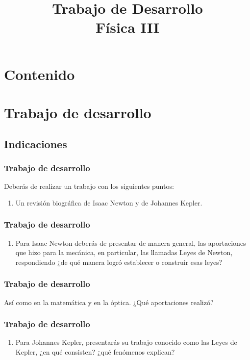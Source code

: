 \documentclass[14pt]{beamer}
\title{\Large{Trabajo de Desarrollo} \\ \normalsize{Física III}}
\date{}
\begin{document}
\maketitle
  
\section*{Contenido}

\section{Trabajo de desarrollo}
\subsection{Indicaciones}

\begin{frame}
\frametitle{Trabajo de desarrollo}
Deberás de realizar un trabajo con los siguientes puntos:
\pause
{}
\begin{enumerate}[<+->]
\item Un revisión biográfica de Isaac Newton y de Johannes Kepler.
\seti
\end{enumerate}
\end{frame}
\begin{frame}
\frametitle{Trabajo de desarrollo}
\begin{enumerate}[<+->]
\conti
\item Para Isaac Newton deberás de presentar de manera general, las aportaciones que hizo para la mecánica, en particular, las llamadas Leyes de Newton, respondiendo ¿de qué manera logró establecer o construir esas leyes?
\seti
\end{enumerate}
\end{frame}
\begin{frame}
\frametitle{Trabajo de desarrollo}
Así como en la matemática y en la óptica. ¿Qué aportaciones realizó?
\end{frame}
\begin{frame}
\frametitle{Trabajo de desarrollo}
\begin{enumerate}[<+->]
\conti
\item Para Johannes Kepler, presentarás su trabajo conocido como las Leyes de Kepler, ¿en qué consisten? ¿qué fenómenos explican?
\seti
\end{enumerate}
\end{frame}
\end{document}

